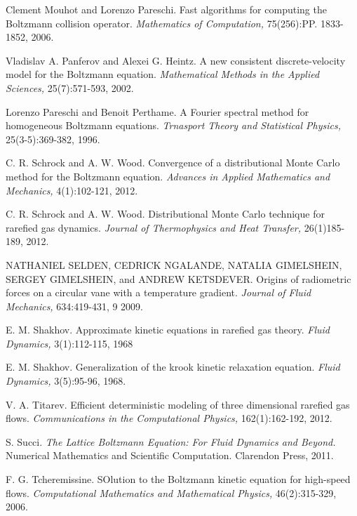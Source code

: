 \documentclass[12pt]{CSUNthesis}
\begin{document}
\begin{footnotesize}
\begin{thebibliography}{100}
 Clement Mouhot and Lorenzo Pareschi. Fast algorithms for computing the Boltzmann collision operator. \textit{Mathematics of Computation,} 75(256):PP. 1833-1852, 2006.

 Vladislav A. Panferov and Alexei G. Heintz. A new consistent discrete-velocity model for the Boltzmann equation. \textit{Mathematical Methods in the Applied Sciences,} 25(7):571-593, 2002.

 Lorenzo Pareschi and Benoit Perthame. A Fourier spectral method for homogeneous Boltzmann equations. \textit{Trnasport Theory and Statistical Physics,} 25(3-5):369-382, 1996.

 C. R. Schrock and A. W. Wood. Convergence of a distributional Monte Carlo method for the Boltzmann equation. \textit{Advances in Applied Mathematics and Mechanics,} 4(1):102-121, 2012.

 C. R. Schrock and A. W. Wood. Distributional Monte Carlo technique for rarefied gas dynamics. \textit{Journal of Thermophysics and Heat Transfer,} 26(1)185-189, 2012.

 NATHANIEL SELDEN, CEDRICK NGALANDE, NATALIA GIMELSHEIN, SERGEY GIMELSHEIN, and ANDREW KETSDEVER. Origins of radiometric forces on a circular vane with a temperature gradient. \textit{Journal of Fluid Mechanics,} 634:419-431, 9 2009.

 E. M. Shakhov. Approximate kinetic equations in rarefied gas theory. \textit{Fluid Dynamics,} 3(1):112-115, 1968

 E. M. Shakhov. Generalization of the krook kinetic relaxation equation. \textit{Fluid Dynamics,} 3(5):95-96, 1968.

 V. A. Titarev. Efficient deterministic modeling of three dimensional rarefied gas flows. \textit{Communications in the Computational Physics,} 162(1):162-192, 2012.

 S. Succi. \textit{The Lattice Boltzmann Equation: For Fluid Dynamics and Beyond.} Numerical Mathematics and Scientific Computation. Clarendon Press, 2011.

 F. G. Tcheremissine. SOlution to the Boltzmann kinetic equation for high-speed flows. \textit{Computational Mathematics and Mathematical Physics,} 46(2):315-329, 2006.
 
\end{thebibliography} 
\end{footnotesize}
\end{document}
